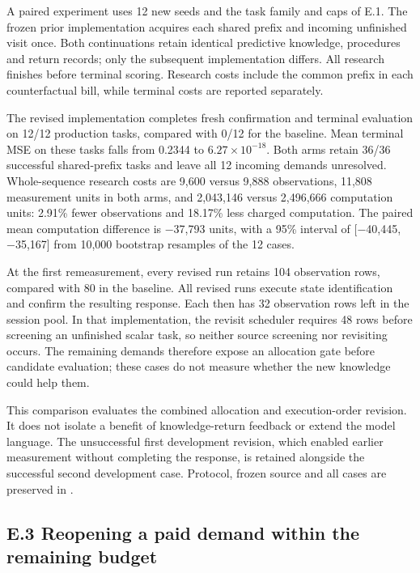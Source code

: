 \documentclass[twoside,11pt]{article}
\begin{document}
A paired experiment uses 12 new seeds and the task family and caps of E.1. The
frozen prior implementation acquires each shared prefix and incoming unfinished
visit once. Both continuations retain identical predictive knowledge, procedures
and return records; only the subsequent implementation differs. All research
finishes before terminal scoring. Research costs include the common prefix in
each counterfactual bill, while terminal costs are reported separately.


The revised implementation completes fresh confirmation and terminal evaluation
on 12/12 production tasks, compared with 0/12 for the baseline. Mean terminal MSE
on these tasks falls from 0.2344 to \(6.27\times10^{-18}\). Both arms retain 36/36
successful shared-prefix tasks and leave all 12 incoming demands unresolved.
Whole-sequence research costs are 9,600 versus 9,888 observations, 11,808
measurement units in both arms, and 2,043,146 versus 2,496,666 computation units:
2.91\% fewer observations and 18.17\% less charged computation. The paired mean
computation difference is −37,793 units, with a 95\% interval of
[−40,445, −35,167] from 10,000 bootstrap resamples of the 12 cases.


At the first remeasurement, every revised run retains 104 observation rows,
compared with 80 in the baseline. All revised runs execute state identification
and confirm the resulting response. Each then has 32 observation rows left in
the session pool. In that implementation, the revisit scheduler requires 48 rows before screening an
unfinished scalar task, so neither source screening nor revisiting occurs.
The remaining demands therefore expose an allocation gate before candidate
evaluation; these cases do not measure whether the new knowledge could help them.


This comparison evaluates the combined allocation and execution-order revision.
It does not isolate a benefit of knowledge-return feedback or extend the model
language. The unsuccessful first development revision, which enabled earlier
measurement without completing the response, is retained alongside the successful
second development case. Protocol, frozen source and all cases are preserved in
.


\subsection*{E.3 Reopening a paid demand within the remaining budget}
\end{document}
